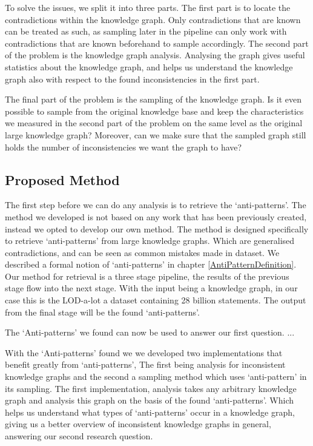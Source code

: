 \documentclass{article}
\begin{document}
To solve the issues, we split it into three parts. The first part is to locate the contradictions within the knowledge graph. Only contradictions that are known can be treated as such, as sampling later in the pipeline can only work with contradictions that are known beforehand to sample accordingly.
The second part of the problem is the knowledge graph analysis. Analysing the graph gives useful statistics about the knowledge graph, and helps us understand the knowledge graph also with respect to the found inconsistencies in the first part.

The final part of the problem is the sampling of the knowledge graph. Is it even possible to sample from the original knowledge base and keep the characteristics we measured in the second part of the problem on the same level as the original large knowledge graph? Moreover, can we make sure that the sampled graph still holds the number of inconsistencies we want the graph to have? 

\subsection{Proposed Method}
The first step before we can do any analysis is to retrieve the `anti-patterns'. The method we developed is not based on any work that has been previously created, instead we opted to develop our own method. The method is designed specifically to retrieve `anti-patterns' from large knowledge graphs. Which are generalised contradictions, and can be seen as common mistakes made in dataset. We described a formal notion of `anti-patterns' in chapter \ref{AntiPatternDefinition}. Our method for retrieval is a three stage pipeline, the results of the previous stage flow into the next stage. With the input being a knowledge graph, in our case this is the LOD-a-lot\cite{JavierD:2017} a dataset containing 28 billion statements. The output from the final stage will be the found `anti-patterns'. 

The `Anti-patterns' we found can now be used to answer our first question. ... 

With the `Anti-patterns' found we we developed two implementations that benefit greatly from `anti-patterns', The first being analysis for inconsistent knowledge graphs and the second a sampling method which uses `anti-pattern' in its sampling. The first implementation, analysis takes any arbitrary knowledge graph and analysis this graph on the basis of the found `anti-patterns'. Which helps us understand what types of `anti-patterns' occur in a knowledge graph, giving us a better overview of inconsistent knowledge graphs in general, answering our second research question.
\end{document}
